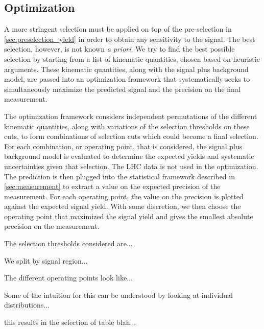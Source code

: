 \subsection{Optimization}
\label{sec:optimization}

A more stringent selection must be applied on top of the pre-selection
in \sec\ref{sec:preselection_yield} in order to obtain any
sensitivity to the signal.  The best selection, however, is
not known \emph{a priori}. We try to find the best possible selection
by starting from a list of kinematic quantities, chosen based on heuristic
arguments. These kinematic quantities, along with the signal
plus background model, are passed into an optimization 
framework that systematically seeks to simultaneously 
maximize the predicted signal and the precision on the final measurement.

The optimization framework considers independent permutations of the different
kinematic quantities, along with variations of the selection thresholds
on these cuts, to form combinations of selection cuts which could become a final
selection. For each combination, or operating point,
that is considered, the signal plus background
model is evaluated to determine the expected yields and systematic
uncertainties given that selection.  The LHC data is not used in the optimization.  
The prediction is then plugged into the statistical framework described in
\sec\ref{sec:measurement} to extract a value on the expected precision
of the measurement. For each operating point,
the value on the precision is plotted against the expected signal yield.
With some discretion, we then choose the operating point 
that maximized the signal yield and gives the smallest absolute 
precision on the measurement. 


The selection thresholds considered are...

We split by signal region...

The different operating points look like...


Some of the intuition for this can be understood by looking at individual
distributions...

this results in the selection of table blah...
